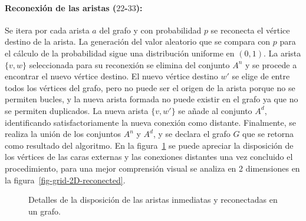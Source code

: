 \paragraph{Reconexi\'on de las aristas ($22$-$33$):} Se itera por cada arista $a$ del grafo y con probabilidad $p$ se reconecta el v\'ertice destino de la arista. La generaci\'on del valor aleatorio que se compara con $p$ para el c\'alculo de la probabilidad sigue una distribuci\'on uniforme en $(0,1)$. La arista $\lbrace v,w \rbrace$ seleccionada para su reconexi\'on se elimina del conjunto $A^n$ y se procede a encontrar el nuevo v\'ertice destino. El nuevo v\'ertice destino $w'$ se elige de entre todos los v\'ertices del grafo, pero no puede ser el origen de la arista porque no se permiten bucles, y la nueva arista formada no puede existir en el grafo ya que no se permiten duplicados. La nueva arista $\lbrace v,w' \rbrace$ se a\~nade al conjunto $A^d$, identificando satisfactoriamente la nueva conexi\'on como distante. Finalmente, se realiza la uni\'on de los conjuntos $A^n$ y $A^d$, y se declara el grafo $G$ que se retorna como resultado del algoritmo. En la figura~\ref{fig-grid-3D-reconected} se puede apreciar la disposici\'on de los v\'ertices de las caras externas y las conexiones distantes una vez concluido el procedimiento, para una mejor comprensión visual se analiza en 2 dimensiones en la figura~\ref{fig-grid-2D-reconected}.

\begin{figure}[!ht]
	\begin{center}
	\end{center}\vspace*{-0.6cm}
	\caption[Detalles de la disposici\'on de las aristas inmediatas y reconectadas en el grafo]{Detalles de la disposici\'on de las aristas inmediatas y reconectadas en un grafo.}
	\label{fig-grid-3D-reconected}
	\end{figure}

